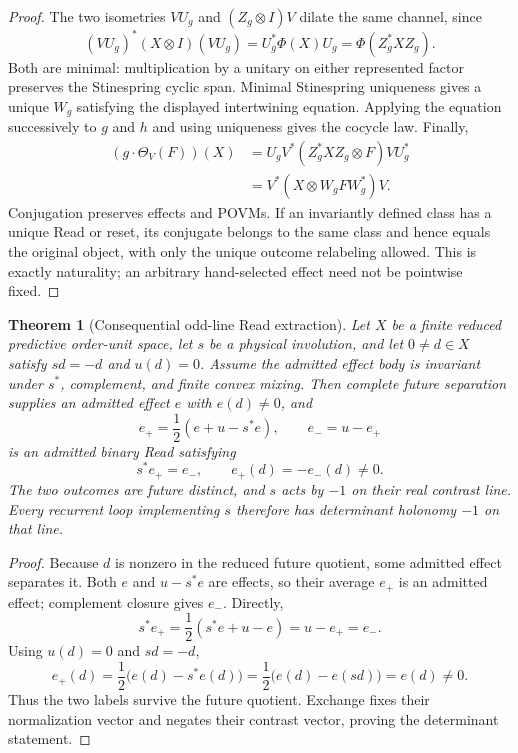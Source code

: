 \documentclass[11pt]{article}
\newtheorem{theorem}{Theorem}[section]
\theoremstyle{definition}
\theoremstyle{remark}
\begin{document}
\begin{proof}
The two isometries $VU_g$ and $(Z_g\otimes I)V$ dilate the same channel, since
\[
 (VU_g)^*(X\otimes I)(VU_g)=U_g^*\Phi(X)U_g
 =\Phi(Z_g^*XZ_g).
\]
Both are minimal: multiplication by a unitary on either represented factor
preserves the Stinespring cyclic span.  Minimal Stinespring uniqueness gives a
unique $W_g$ satisfying the displayed intertwining equation.  Applying the
equation successively to $g$ and $h$ and using uniqueness gives the cocycle
law.  Finally,
\[
\begin{aligned}
 (g\cdot\Theta_V(F))(X)
 &=U_gV^*(Z_g^*XZ_g\otimes F)VU_g^*\\
 &=V^*(X\otimes W_gFW_g^*)V.
\end{aligned}
\]
Conjugation preserves effects and POVMs.  If an invariantly defined class has a
unique Read or reset, its conjugate belongs to the same class and hence equals
the original object, with only the unique outcome relabeling allowed.  This is
exactly naturality; an arbitrary hand-selected effect need not be pointwise
fixed.
\end{proof}

\begin{theorem}[Consequential odd-line Read extraction]
\label{thm:consequential-odd-read-master}
Let $X$ be a finite reduced predictive order-unit space, let $s$ be a physical
involution, and let $0\ne d\in X$ satisfy $sd=-d$ and $u(d)=0$.  Assume the
admitted effect body is invariant under $s^*$, complement, and finite convex
mixing.  Then complete future separation supplies an admitted effect $e$ with
$e(d)\ne0$, and
\[
 \boxed{
 e_+=\frac12(e+u-s^*e),
 \qquad e_-=u-e_+
 }
\]
is an admitted binary Read satisfying
\[
 s^*e_+=e_-,
 \qquad
 e_+(d)=-e_-(d)\ne0.
\]
The two outcomes are future distinct, and $s$ acts by $-1$ on their real
contrast line.  Every recurrent loop implementing $s$ therefore has
determinant holonomy $-1$ on that line.
\end{theorem}

\begin{proof}
Because $d$ is nonzero in the reduced future quotient, some admitted effect
separates it.  Both $e$ and $u-s^*e$ are effects, so their average $e_+$ is an
admitted effect; complement closure gives $e_-$.  Directly,
\[
 s^*e_+=\frac12(s^*e+u-e)=u-e_+=e_-.
\]
Using $u(d)=0$ and $sd=-d$,
\[
 e_+(d)=\frac12\bigl(e(d)-s^*e(d)\bigr)
       =\frac12\bigl(e(d)-e(sd)\bigr)=e(d)\ne0.
\]
Thus the two labels survive the future quotient.  Exchange fixes their
normalization vector and negates their contrast vector, proving the determinant
statement.
\end{proof}
\end{document}
